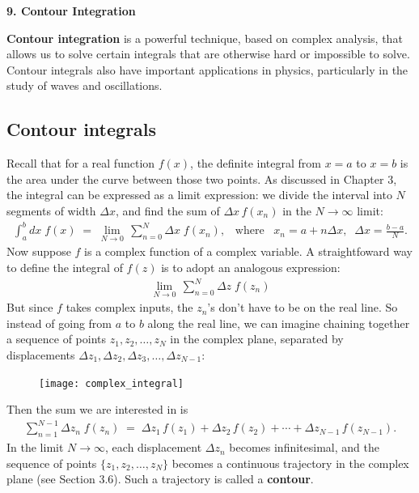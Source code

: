 \documentclass[10pt,a4paper]{article}
\begin{document}
\setcounter{page}{61}

\noindent
{\Large \textbf{9. Contour Integration}}
\vskip 0.2in

\label{contour-integration}

\textbf{Contour integration} is a powerful technique, based on complex
analysis, that allows us to solve certain integrals that are otherwise
hard or impossible to solve.  Contour integrals also have important
applications in physics, particularly in the study of waves and
oscillations.

\subsection{Contour integrals}
\label{contour-integrals}

Recall that for a real function $f(x)$, the definite integral from
$x=a$ to $x=b$ is the area under the curve between those two
points. As discussed in Chapter 3, the integral can be expressed as a
limit expression: we divide the interval into $N$ segments of width
$\Delta x$, and find the sum of $\Delta x\, f(x_n)$ in the $N
\rightarrow \infty$ limit:
\begin{align}
  \int_a^b dx\; f(x) \;=\; \lim_{N \rightarrow 0} \, \sum_{n=0}^{N} \Delta x\; f(x_n), \;\;\;\mathrm{where}\;\;\;x_n = a + n\Delta x, \;\;\Delta x = \frac{b-a}{N}.
\end{align}
Now suppose $f$ is a complex function of a complex variable. A
straightfoward way to define the integral of $f(z)$ is to adopt an
analogous expression:
\begin{align*}
  \lim_{N \rightarrow 0} \, \sum_{n=0}^{N} \Delta z\; f(z_n)
\end{align*}
But since $f$ takes complex inputs, the $z_n$'s don't have to be on
the real line. So instead of going from $a$ to $b$ along the real
line, we can imagine chaining together a sequence of points $z_1, z_2,
\dots, z_N$ in the complex plane, separated by displacements $\Delta
z_1, \Delta z_2, \Delta z_3, \dots, \Delta z_{N-1}$:

\begin{figure}[ht]
  \centering\texttt{[image: complex\_integral]}
\end{figure}

\noindent
Then the sum we are interested in is
\begin{align}
  \sum_{n=1}^{N-1} \Delta z_n\; f(z_n) \;=\; \Delta z_1\, f(z_1) + \Delta z_2\, f(z_2) + \cdots + \Delta z_{N-1}\, f(z_{N-1}).
\end{align}
In the limit $N \rightarrow \infty$, each displacement $\Delta z_{n}$
becomes infinitesimal, and the sequence of points $\{z_1, z_2, \dots,
z_N\}$ becomes a continuous trajectory in the complex plane (see
Section 3.6). Such a trajectory is called a \textbf{contour}.
\end{document}

